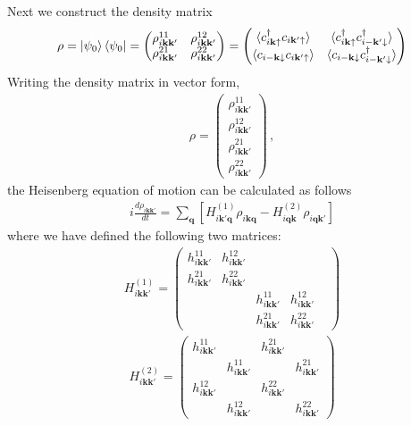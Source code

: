 \documentclass[aps,prb,reprint,noeprint,superscriptaddress]{revtex4-1}
\begin{document}
Next we construct the density matrix
\begin{eqnarray*}
  \rho = \ket{\psi_0}\bra{\psi_0} = 
  \begin{pmatrix}
    \rho_{i\mathbf{kk'}}^{11} &
    \rho_{i\mathbf{kk'}}^{12} \\
    \rho_{i\mathbf{kk'}}^{21} &
    \rho_{i\mathbf{kk'}}^{22}
  \end{pmatrix}
  =
  \begin{pmatrix}
    \langle c_{i\mathbf{k}\uparrow }^\dagger c_{i\mathbf{k}'\uparrow }\rangle
    &
    \langle c_{i\mathbf{k}\uparrow }^\dagger c_{i-\mathbf{k}'\downarrow
    }^\dagger \rangle
    \\
    \langle 
    c_{i-\mathbf{k}\downarrow }c_{i\mathbf{k'}\uparrow }
    \rangle
    &
    \langle 
    c_{i-\mathbf{k}\downarrow }c_{i\mathbf{-k'}\downarrow }^\dagger 
    \rangle
  \end{pmatrix}
\end{eqnarray*}
Writing the density matrix in vector form,
\begin{eqnarray*}
  \rho = 
  \begin{pmatrix}
    \rho_{i\mathbf{kk'}}^{11} \\
    \rho_{i\mathbf{kk'}}^{12} \\
    \rho_{i\mathbf{kk'}}^{21} \\
    \rho_{i\mathbf{kk'}}^{22}
  \end{pmatrix} \,,
\end{eqnarray*}
the Heisenberg equation of motion can be calculated as follows
\begin{eqnarray*}
  i\frac{d \rho_{i\mathbf{k}\mathbf{k}'}}{dt}
  =
  \sum_{\mathbf{q}}^{}
  \left[ 
    H_{i\mathbf{k}' \mathbf{q}}^{(1)} \rho_{i\mathbf{kq}} -
    H_{i\mathbf{qk}}^{(2)}
    \rho_{i\mathbf{qk'}}
  \right]
\end{eqnarray*}
where we have defined the following two matrices:
\begin{eqnarray*}
  H_{i\mathbf{kk'}}^{(1)}
  =
  \begin{pmatrix}
    h_{i\mathbf{kk'}}^{11} & h_{i\mathbf{kk'}}^{12} & & \\
    h_{i\mathbf{kk'}}^{21} & h_{i\mathbf{kk'}}^{22} & & \\
    && h_{i\mathbf{kk'}}^{11} & h_{i\mathbf{kk'}}^{12} \\
    && h_{i\mathbf{kk'}}^{21} & h_{i\mathbf{kk'}}^{22} & 
  \end{pmatrix}
\end{eqnarray*}
\begin{eqnarray*}
  H_{i\mathbf{kk'}}^{(2)}
  =
  \begin{pmatrix}
    h_{i\mathbf{kk'}}^{11} && h_{i\mathbf{kk'}}^{21} & \\
    & h_{i\mathbf{kk'}}^{11} && h_{i\mathbf{kk'}}^{21} \\
    h_{i\mathbf{kk'}}^{12} && h_{i\mathbf{kk'}}^{22} & \\
    & h_{i\mathbf{kk'}}^{12} && h_{i\mathbf{kk'}}^{22}
  \end{pmatrix}
\end{eqnarray*}
\end{document}
